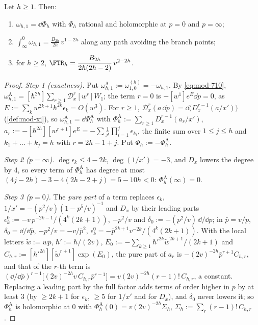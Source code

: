 \begin{prop}
\label{prop:mod-period}
Let $h\geq 1$. Then:
\begin{enumerate}
\item $\omega_{h,1}=\dd\Phi_h$ with $\Phi_h$ rational and holomorphic at $p=0$ and $p=\infty$;
\item $\int_\infty^0\omega_{h,1}=\frac{B_{2h}}{2h}\,v^{1-2h}$ along any path avoiding the branch points;
\item for $h\geq 2$, $\FTR_h=\dfrac{B_{2h}}{2h(2h-2)}\,v^{2-2h}$.
\end{enumerate}
\end{prop}

\begin{proof}
\emph{Step 1 (exactness).} Put $\omega^{\mathrm A}_{h,1}:=\omega^{(h)}_{1,0}=-\omega_{h,1}$. By \eqref{eq:mod-710}, $\omega^{\mathrm A}_{h,1}=[\hbar^{2h}]\sum_{r\geq 1}\mathcal D_x^r[w^r]W_1$; the term $r=0$ is $-[w^1]e^{E}\dd p=0$, as $E:=\sum_kw^{2k+1}\hbar^{2k}\epsilon_k=O(w^3)$. For $r\geq 1$, $\mathcal D_x^r(a\,\dd p)=\dd\big(D_x^{r-1}(a/x')\big)$ (\cref{def:mod-xi}), so $\omega^{\mathrm A}_{h,1}=\dd\Phi^{\mathrm A}_h$ with $\Phi^{\mathrm A}_h:=\sum_{r\geq 1}D_x^{r-1}(a_r/x')$, $a_r:=-[\hbar^{2h}][w^{r+1}]e^{E}=-\sum\frac1{j!}\prod_{i=1}^j\epsilon_{k_i}$, the finite sum over $1\leq j\leq h$ and $k_1+\dots+k_j=h$ with $r=2h-1+j$. Put $\Phi_h:=-\Phi^{\mathrm A}_h$.

\emph{Step 2 ($p=\infty$).} $\deg\epsilon_k\leq 4-2k$, $\deg(1/x')=-3$, and $D_x$ lowers the degree by $4$, so every term of $\Phi^{\mathrm A}_h$ has degree at most $(4j-2h)-3-4(2h-2+j)=5-10h<0$: $\Phi^{\mathrm A}_h(\infty)=0$.

\emph{Step 3 ($p=0$).} The \emph{pure part} of a term replaces $\epsilon_k$, $1/x'=-(p^2/v)(1-p^5/v)^{-1}$ and $D_x$ by their leading parts $\epsilon^0_k:=-v\,p^{-2k-1}/(4^k(2k+1))$, $-p^2/v$ and $\delta_0:=-(p^2/v)\,\dd/\dd p$; in $\bar p=v/p$, $\delta_0=\dd/\dd\bar p$, $-p^2/v=-v/\bar p^2$, $\epsilon^0_k=-\bar p^{2k+1}v^{-2k}/(4^k(2k+1))$. With the local letters $\tilde w:=w\bar p$, $\hbar':=\hbar/(2v)$, $E_0:=-\sum_{k\geq 1}\hbar'^{2k}\tilde w^{2k+1}/(2k+1)$ and $C_{h,r}:=[\hbar'^{2h}][\tilde w^{r+1}]\exp(E_0)$, the pure part of $a_r$ is $-(2v)^{-2h}\bar p^{r+1}C_{h,r}$, and that of the $r$-th term is $(\dd/\dd\bar p)^{r-1}\big[(2v)^{-2h}v\,C_{h,r}\bar p^{r-1}\big]=v(2v)^{-2h}(r-1)!\,C_{h,r}$, a constant. Replacing a leading part by the full factor adds terms of order higher in $p$ by at least $3$ (by $\geq 2k+1$ for $\epsilon_k$, $\geq 5$ for $1/x'$ and for $D_x$), and $\delta_0$ never lowers it; so $\Phi^{\mathrm A}_h$ is holomorphic at $0$ with $\Phi^{\mathrm A}_h(0)=v(2v)^{-2h}\Sigma_h$, $\Sigma_h:=\sum_r(r-1)!\,C_{h,r}$.


\end{proof}
